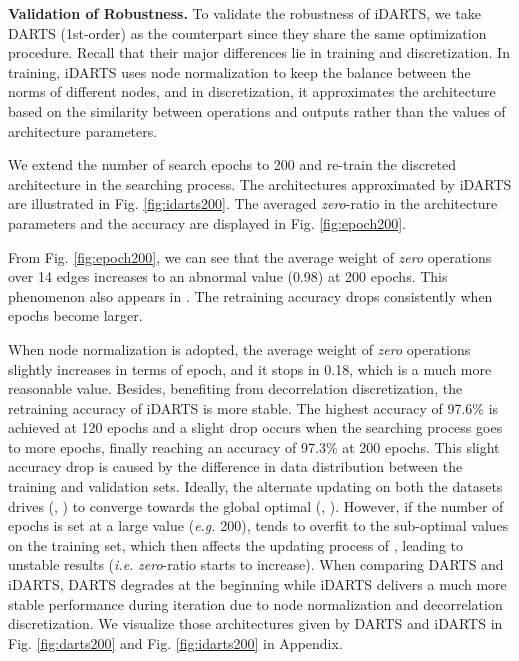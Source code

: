 \documentclass[journal]{IEEEtran}
\begin{document}
\textbf{Validation of Robustness.} To validate the robustness of iDARTS, we take DARTS (1st-order) as the counterpart since they share the same optimization procedure. Recall that their major differences lie in training and discretization. In training, iDARTS uses node normalization to keep the balance between the norms of different nodes, and in discretization, it approximates the architecture based on the similarity between operations and outputs rather than the values of architecture parameters. 


We extend the number of search epochs to 200 and re-train the discreted architecture in the searching process. The architectures approximated by iDARTS are illustrated in Fig. \ref{fig:idarts200}. The averaged \textit{zero}-ratio in the architecture parameters and the accuracy are displayed in Fig. \ref{fig:epoch200}.


From Fig. \ref{fig:epoch200}, we can see that the average weight of \textit{zero} operations over 14 edges increases to an abnormal value (0.98) at 200 epochs. This phenomenon also appears in \cite{DBLP:journals/corr/abs-1910-11831}. The retraining accuracy drops consistently when epochs become larger.

When node normalization is adopted, the average weight of \textit{zero} operations slightly increases in terms of epoch, and it stops in 0.18, which is a much more reasonable value. Besides, benefiting from decorrelation discretization, the retraining accuracy of iDARTS is more stable. The highest accuracy of 97.6\% is achieved at 120 epochs and a slight drop occurs when the searching process goes to more epochs, finally reaching an accuracy of 97.3\% at 200 epochs. This slight accuracy drop is caused by the difference in data distribution between the training and validation sets.  Ideally, the alternate updating on both the datasets drives (, ) to converge towards the global optimal (, ). However, if the number of epochs is set at a large value (\emph{e.g.} 200),  tends to overfit to the sub-optimal values  on the training set, which then affects the updating process of , leading to unstable results (\emph{i.e.} \textit{zero}-ratio starts to increase). When comparing DARTS and iDARTS, DARTS degrades at the beginning while iDARTS delivers a much more stable performance during iteration due to node normalization and decorrelation discretization. We visualize those architectures given by DARTS and iDARTS in Fig. \ref{fig:darts200} and Fig. \ref{fig:idarts200} in Appendix.
\end{document}
